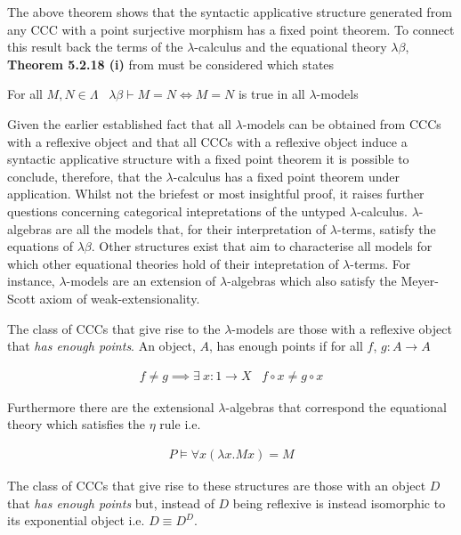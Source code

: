 The above theorem shows that the syntactic applicative structure generated from
any CCC with a point surjective morphism has a fixed point theorem. To connect
this result back the terms of the $\lambda$-calculus and the equational theory
$\lambda\beta$,  \textbf{Theorem 5.2.18 (i)} from \cite{barendregt1992lambda} must
be considered which states

\begin{theorem*}
    For all $M, N \in \Lambda \; \; \; \lambda\beta \vdash  M = N \Leftrightarrow M =
    N$ is true in all $\lambda$-models
\end{theorem*}

Given the earlier established fact that all $\lambda$-models can be obtained
from CCCs with a reflexive object and that all CCCs with a reflexive object
induce a syntactic applicative structure with a fixed point theorem it is
possible to conclude, therefore, that the $\lambda$-calculus has a fixed point
theorem under application. Whilst not the briefest or most insightful proof, it 
 raises further questions concerning categorical intepretations
of the untyped $\lambda$-calculus. $\lambda$-algebras are all the models that,
for their interpretation of $\lambda$-terms, satisfy the equations of
$\lambda\beta$. Other structures exist that aim to characterise all models for
which other equational theories hold of their intepretation of $\lambda$-terms.
For instance, $\lambda$-models are an extension of $\lambda$-algebras which also
satisfy the Meyer-Scott axiom of weak-extensionality. 


The class of CCCs that give rise to the $\lambda$-models are those with a
reflexive object that \textit{has enough points}. An object, $A$, has enough
points if for all $f$, $g : A \rightarrow A$

\begin{align*}
    f \neq  g \implies \exists \: x : 1 \rightarrow X \; \; \; f \circ x \neq g \circ x
\end{align*}


Furthermore there are the extensional $\lambda$-algebras that correspond the
equational theory which satisfies the $\eta$ rule i.e.

\begin{align*}
    P \vDash \forall x (\lambda x . M
    x) = M
\end{align*}

The class of CCCs that give rise to these structures are those with an object
$D$ that \textit{has
enough points} but, instead of $D$ being reflexive is instead
isomorphic to its exponential object i.e. $D \equiv D^{D}$.

